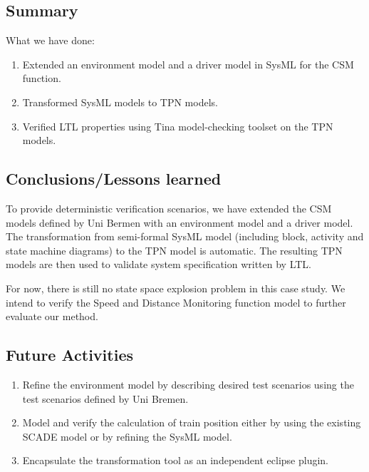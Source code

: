 \subsection{Summary}

What we have done:
\begin{enumerate}
\item Extended an environment model and a driver model in SysML for the CSM function.
\item Transformed SysML models to TPN models.
\item Verified LTL properties using Tina model-checking toolset on the TPN models.
\end{enumerate}

\subsection{Conclusions/Lessons learned}

To provide deterministic verification scenarios, we have extended the CSM models defined by Uni Bermen with an environment model and a driver model. 
The transformation from semi-formal SysML model (including block, activity and state machine diagrams) to the TPN model is automatic. The resulting TPN models are then used to validate system specification written by LTL. 

For now, there is still no state space explosion problem in this case study. We intend to verify the Speed and Distance Monitoring function model to further evaluate our method. 

\subsection{Future Activities}
 \begin{enumerate}
 \item Refine the environment model by describing desired test scenarios using the test scenarios defined by Uni Bremen. 
 \item Model and verify the calculation of train position either by using the existing SCADE model or by refining the SysML model.
 \item Encapsulate the transformation tool as an independent eclipse plugin. 
 \end{enumerate}

%
%

